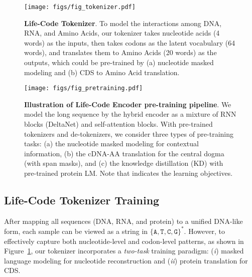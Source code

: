 \begin{figure}[b!]
    \vspace{-0.5em}
    \centering
    \texttt{[image: figs/fig\_tokenizer.pdf]}
    \vspace{-2.25em}
    \caption{\textbf{Life-Code Tokenizer}. To model the interactions among DNA, RNA, and Amino Acids, our tokenizer takes nucleotide acids (4 words) as the inputs, then takes codons as the latent vocabulary (64 words), and translates them to Amino Acids (20 words) as the outputs, which could be pre-trained by (a) nucleotide masked modeling and (b) CDS to Amino Acid translation.
    }
    \label{fig:tokenizer}
    \vspace{-0.5em}
\end{figure}

\begin{figure*}[t!]
    \centering
    \texttt{[image: figs/fig\_pretraining.pdf]}
    \vspace{-2.25em}
    \caption{\textbf{Illustration of Life-Code Encoder pre-training pipeline}. We model the long sequence by the hybrid encoder as a mixture of RNN blocks (DeltaNet) and self-attention blocks. With pre-trained tokenizers and de-tokenizers, we consider three types of pre-training tasks: (a) the nucleotide masked modeling for contextual information, (b) the cDNA-AA translation for the central dogma (with span masks), and (c) the knowledge distillation (KD) with pre-trained protein LM. Note that  indicates the learning objectives.
    }
    \label{fig:lcode_pretraining}
    \vspace{-1.0em}
\end{figure*}

\subsection{Life-Code Tokenizer Training}

After mapping all sequences (DNA, RNA, and protein) to a unified DNA-like form, each sample can be viewed as a string in \(\{\texttt{A}, \texttt{T}, \texttt{C}, \texttt{G}\}^*\). However, to effectively capture both nucleotide-level and codon-level patterns, as shown in Figure~\ref{fig:tokenizer}, our tokenizer incorporates a \textit{two-task} training paradigm: (\emph{i}) masked language modeling for nucleotide reconstruction and (\emph{ii}) protein translation for CDS.


